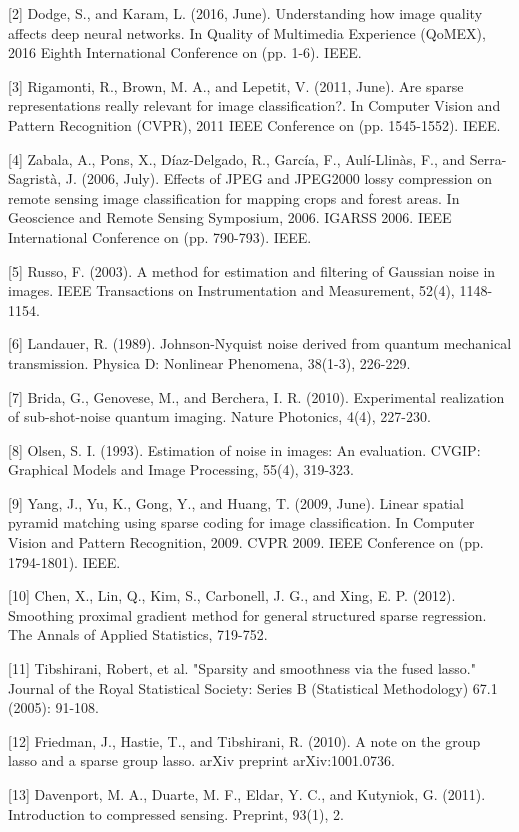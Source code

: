 \documentclass{article}
\begin{document}
[2] Dodge, S., and Karam, L. (2016, June). Understanding how image quality affects deep neural networks. In Quality of Multimedia Experience (QoMEX), 2016 Eighth International Conference on (pp. 1-6). IEEE.

[3] Rigamonti, R., Brown, M. A., and Lepetit, V. (2011, June). Are sparse representations really relevant for image classification?. In Computer Vision and Pattern Recognition (CVPR), 2011 IEEE Conference on (pp. 1545-1552). IEEE.

[4] Zabala, A., Pons, X., Díaz-Delgado, R., García, F., Aulí-Llinàs, F., and Serra-Sagristà, J. (2006, July). Effects of JPEG and JPEG2000 lossy compression on remote sensing image classification for mapping crops and forest areas. In Geoscience and Remote Sensing Symposium, 2006. IGARSS 2006. IEEE International Conference on (pp. 790-793). IEEE.

[5] Russo, F. (2003). A method for estimation and filtering of Gaussian noise in images. IEEE Transactions on Instrumentation and Measurement, 52(4), 1148-1154.

[6] Landauer, R. (1989). Johnson-Nyquist noise derived from quantum mechanical transmission. Physica D: Nonlinear Phenomena, 38(1-3), 226-229.

[7] Brida, G., Genovese, M., and Berchera, I. R. (2010). Experimental realization of sub-shot-noise quantum imaging. Nature Photonics, 4(4), 227-230.

[8] Olsen, S. I. (1993). Estimation of noise in images: An evaluation. CVGIP: Graphical Models and Image Processing, 55(4), 319-323.

[9] Yang, J., Yu, K., Gong, Y., and Huang, T. (2009, June). Linear spatial pyramid matching using sparse coding for image classification. In Computer Vision and Pattern Recognition, 2009. CVPR 2009. IEEE Conference on (pp. 1794-1801). IEEE.

[10] Chen, X., Lin, Q., Kim, S., Carbonell, J. G., and Xing, E. P. (2012). Smoothing proximal gradient method for general structured sparse regression. The Annals of Applied Statistics, 719-752.

[11] Tibshirani, Robert, et al. "Sparsity and smoothness via the fused lasso." Journal of the Royal Statistical Society: Series B (Statistical Methodology) 67.1 (2005): 91-108.

[12] Friedman, J., Hastie, T., and Tibshirani, R. (2010). A note on the group lasso and a sparse group lasso. arXiv preprint arXiv:1001.0736.

[13] Davenport, M. A., Duarte, M. F., Eldar, Y. C., and Kutyniok, G. (2011). Introduction to compressed sensing. Preprint, 93(1), 2.
 
\end{document}

